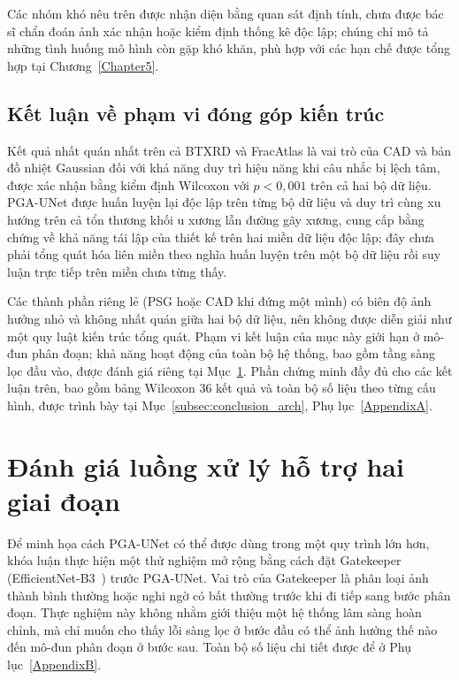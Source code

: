 Các nhóm khó nêu trên được nhận diện bằng quan sát định tính, chưa được bác sĩ chẩn đoán ảnh xác nhận hoặc kiểm định thống kê độc lập; chúng chỉ mô tả những tình huống mô hình còn gặp khó khăn, phù hợp với các hạn chế được tổng hợp tại Chương~\ref{Chapter5}.

\subsection{Kết luận về phạm vi đóng góp kiến trúc}
\label{subsec:conclusion_arch_summary}

Kết quả nhất quán nhất trên cả BTXRD và FracAtlas là vai trò của CAD và bản đồ nhiệt Gaussian đối với khả năng duy trì hiệu năng khi câu nhắc bị lệch tâm, được xác nhận bằng kiểm định Wilcoxon với $p<0{,}001$ trên cả hai bộ dữ liệu. PGA-UNet được huấn luyện lại độc lập trên từng bộ dữ liệu và duy trì cùng xu hướng trên cả tổn thương khối u xương lẫn đường gãy xương, cung cấp bằng chứng về khả năng tái lập của thiết kế trên hai miền dữ liệu độc lập; đây chưa phải tổng quát hóa liên miền theo nghĩa huấn luyện trên một bộ dữ liệu rồi suy luận trực tiếp trên miền chưa từng thấy.

Các thành phần riêng lẻ (PSG hoặc CAD khi đứng một mình) có biên độ ảnh hưởng nhỏ và không nhất quán giữa hai bộ dữ liệu, nên không được diễn giải như một quy luật kiến trúc tổng quát. Phạm vi kết luận của mục này giới hạn ở mô-đun phân đoạn; khả năng hoạt động của toàn bộ hệ thống, bao gồm tầng sàng lọc đầu vào, được đánh giá riêng tại Mục~\ref{sec:product_overview}. Phần chứng minh đầy đủ cho các kết luận trên, bao gồm bảng Wilcoxon 36 kết quả và toàn bộ số liệu theo từng cấu hình, được trình bày tại Mục~\ref{subsec:conclusion_arch}, Phụ lục~\ref{AppendixA}.

\section{Đánh giá luồng xử lý hỗ trợ hai giai đoạn}
\label{sec:product_overview}

Để minh họa cách PGA-UNet có thể được dùng trong một quy trình lớn hơn, khóa luận thực hiện một thử nghiệm mở rộng bằng cách đặt Gatekeeper (EfficientNet-B3~\cite{tan2019efficientnet}) trước PGA-UNet. Vai trò của Gatekeeper là phân loại ảnh thành bình thường hoặc nghi ngờ có bất thường trước khi đi tiếp sang bước phân đoạn. Thực nghiệm này không nhằm giới thiệu một hệ thống lâm sàng hoàn chỉnh, mà chỉ muốn cho thấy lỗi sàng lọc ở bước đầu có thể ảnh hưởng thế nào đến mô-đun phân đoạn ở bước sau. Toàn bộ số liệu chi tiết được để ở Phụ lục~\ref{AppendixB}.

